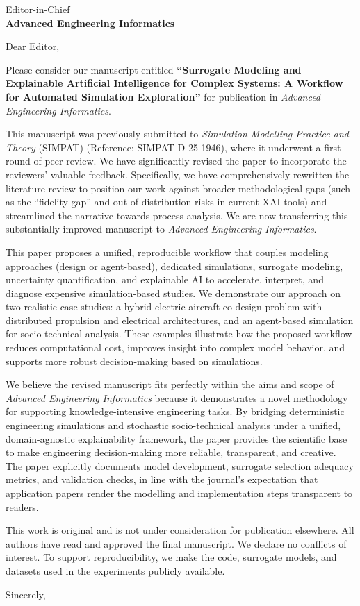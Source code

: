 \documentclass[11pt,a4paper]{letter}
\date{March 26, 2026}
\begin{document}
\begin{letter}{
    Editor-in-Chief \\
    \textbf{Advanced Engineering Informatics}
}

\opening{Dear Editor,}

Please consider our manuscript entitled \textbf{``Surrogate Modeling and Explainable Artificial Intelligence for Complex Systems: A Workflow for Automated Simulation Exploration''} for publication in \textit{Advanced Engineering Informatics}.

This manuscript was previously submitted to \textit{Simulation Modelling Practice and Theory} (SIMPAT) (Reference: SIMPAT-D-25-1946), where it underwent a first round of peer review. We have significantly revised the paper to incorporate the reviewers' valuable feedback. Specifically, we have comprehensively rewritten the literature review to position our work against broader methodological gaps (such as the ``fidelity gap'' and out-of-distribution risks in current XAI tools) and streamlined the narrative towards process analysis. We are now transferring this substantially improved manuscript to \textit{Advanced Engineering Informatics}.

This paper proposes a unified, reproducible workflow that couples modeling approaches (design or agent-based), dedicated simulations, surrogate modeling, uncertainty quantification, and explainable AI to accelerate, interpret, and diagnose expensive simulation-based studies. We demonstrate our approach on two realistic case studies: a hybrid-electric aircraft co-design problem with distributed propulsion and electrical architectures, and an agent-based simulation for socio-technical analysis. These examples illustrate how the proposed workflow reduces computational cost, improves insight into complex model behavior, and supports more robust decision-making based on simulations.

We believe the revised manuscript fits perfectly within the aims and scope of \textit{Advanced Engineering Informatics} because it demonstrates a novel methodology for supporting knowledge-intensive engineering tasks. By bridging deterministic engineering simulations and stochastic socio-technical analysis under a unified, domain-agnostic explainability framework, the paper provides the scientific base to make engineering decision-making more reliable, transparent, and creative. The paper explicitly documents model development, surrogate selection adequacy metrics, and validation checks, in line with the journal's expectation that application papers render the modelling and implementation steps transparent to readers.

This work is original and is not under consideration for publication elsewhere. All authors have read and approved the final manuscript. We declare no conflicts of interest. To support reproducibility, we make the code, surrogate models, and datasets used in the experiments publicly available.\\[0.2cm]

\closing{Sincerely,}
\end{letter}
\end{document}
